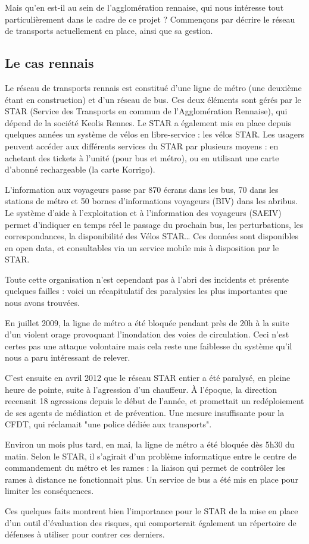 	Mais qu'en est-il au sein de l'agglomération rennaise, qui nous intéresse tout particulièrement dans le cadre de ce projet ? Commençons par décrire le réseau de transports actuellement en place, ainsi que sa gestion.
		
		\subsection{ Le cas rennais }

	Le réseau de transports rennais est constitué d'une ligne de métro (une deuxième étant en construction) et d'un réseau de bus. Ces deux éléments sont gérés par le STAR (Service des Transports en commun de l'Agglomération Rennaise), qui dépend de la société Keolis Rennes. Le STAR a également mis en place depuis quelques années un système de vélos en libre-service : les vélos STAR. Les usagers peuvent accéder aux différents services du STAR par plusieurs moyens : en achetant des tickets à l'unité (pour bus et métro), ou en utilisant une carte d'abonné rechargeable (la carte Korrigo). 
	
	L'information aux voyageurs passe par 870 écrans dans les bus, 70 dans les stations de métro et 50 bornes d’informations voyageurs (BIV) dans les abribus. Le système d’aide à l’exploitation et à l’information des voyageurs (SAEIV) permet d’indiquer en temps réel le passage du prochain bus, les perturbations, les correspondances, la disponibilité des Vélos STAR… Ces données sont disponibles en open data, et consultables via un service mobile mis à disposition par le STAR.

	Toute cette organisation n'est cependant pas à l'abri des incidents et présente quelques failles : voici un récapitulatif des paralysies les plus importantes que nous avons trouvées.

	En juillet 2009, la ligne de métro a été bloquée pendant près de 20h à la suite d'un violent orage provoquant l'inondation des voies de circulation. Ceci n'est certes pas une attaque volontaire mais cela reste une faiblesse du système qu'il nous a paru intéressant de relever. 

	C'est ensuite en avril 2012 que le réseau STAR entier a été paralysé, en pleine heure de pointe, suite à l'agression d'un chauffeur. À l'époque, la direction recensait 18 agressions depuis le début de l'année, et promettait un redéploiement de ses agents de médiation et de prévention. Une mesure insuffisante pour la CFDT, qui réclamait "une police dédiée aux transports".

	Environ un mois plus tard, en mai, la ligne de métro a été bloquée dès 5h30 du matin. Selon le STAR, il s’agirait d’un problème informatique entre le centre de commandement du métro et les rames : la liaison qui permet de contrôler les rames à distance ne fonctionnait plus. Un service de bus a été mis en place pour limiter les conséquences.

	Ces quelques faits montrent bien l'importance pour le STAR de la mise en place d'un outil d'évaluation des risques, qui comporterait également un répertoire de défenses à utiliser pour contrer ces derniers.
